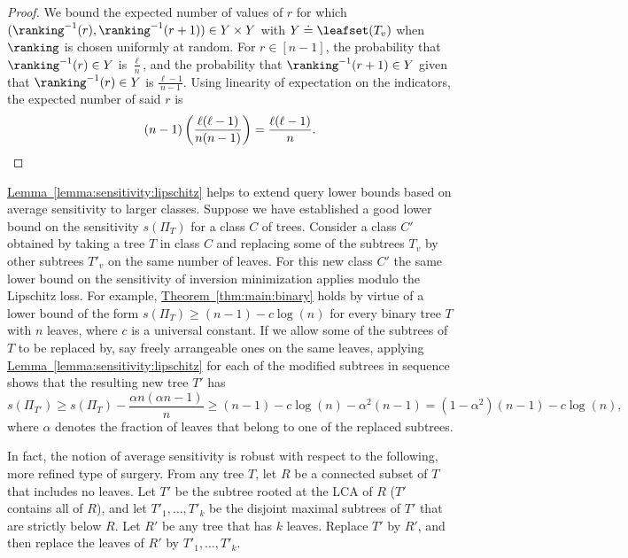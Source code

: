 \documentclass[11pt]{article}
\numberwithin{equation}{section}
\theoremstyle{definition}
\theoremstyle{plain}
\newcommand{\expref}[2]{\hyperref[#2]{#1~\ref{#2}}}
\begin{document}
\begin{proof}
We bound the expected number of values of $r$ for which $(\ranking^{-1}(r),\ranking^{-1}(r+1)) \in Y \times Y$ with $Y \doteq \leafset(T_v)$ when $\ranking$ is chosen uniformly at random. For $r \in [n-1]$, the probability that $\ranking^{-1}(r) \in Y$ is $\frac{\ell}{n}$, and the probability that $\ranking^{-1}(r+1)\in Y$ given that $\ranking^{-1}(r)\in Y$ is $\frac{\ell-1}{n-1}$. Using linearity of expectation on the indicators, the expected number of said $r$ is 
    \begin{equation*}
        (n-1)\left(\frac{\ell(\ell-1)}{n(n-1)}\right) = \frac{\ell(\ell-1)}{n}. \qedhere
    \end{equation*}
\end{proof}

\expref{Lemma}{lemma:sensitivity:lipschitz} helps to extend query lower bounds based on average sensitivity to larger classes. Suppose we have established a good lower bound on the sensitivity $s(\Pi_T)$ for a class $C$ of trees. Consider a class $C'$ obtained by taking a tree $T$ in class $C$ and replacing some of the subtrees $T_v$ by other subtrees $T'_v$ on the same number of leaves. For this new class $C'$ the same lower bound on the sensitivity of inversion minimization applies modulo the Lipschitz loss. For example, \expref{Theorem}{thm:main:binary} holds by virtue of a lower bound of the form $s(\Pi_T) \ge (n-1) - c \log(n)$ for every binary tree $T$ with $n$ leaves, where $c$ is a universal constant. If we allow some of the subtrees of $T$ to be replaced by, say freely arrangeable ones on the same leaves, applying \expref{Lemma}{lemma:sensitivity:lipschitz} for each of the modified subtrees in sequence shows that the resulting new tree $T'$ has 
\[ s(\Pi_{T'}) \ge s(\Pi_T) - \frac{\alpha n (\alpha n - 1)}{n} 
\ge (n-1) - c \log(n) - \alpha^2 (n-1) = (1-\alpha^2)(n-1) - c \log(n), \]
where $\alpha$ denotes the fraction of leaves that belong to one of the replaced subtrees.

In fact, the notion of average sensitivity is robust with respect to the following, more refined type of surgery. From any tree $T$, let $R$ be a connected subset of $T$ that includes no leaves. Let $T'$ be the subtree rooted at the LCA of $R$ ($T'$ contains all of $R$), and let $T'_1, \dots, T'_k$ be the disjoint maximal subtrees of $T'$ that are strictly below $R$. Let $R'$ be any tree that has $k$ leaves. Replace $T'$ by $R'$, and then replace the leaves of $R'$ by $T'_1, \dots, T'_k$.
\end{document}
